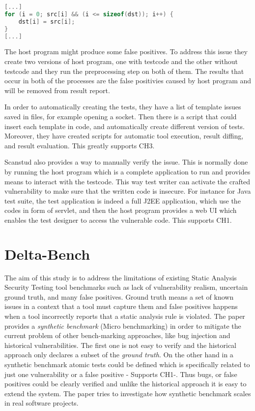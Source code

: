 \documentclass[authoryear,preprint]{sigplanconf}
\begin{document}
\begin{lstlisting}[float,caption=Off-by-one vulnerability caused by insecure loop condition \cite{Scanstud} ,label=ls:sourcec,language=C]
[...]
for (i = 0; src[i] && (i <= sizeof(dst)); i++) {
	dst[i] = src[i];
}
[...]
\end{lstlisting}

The host program might produce some false positives. To address this issue they create two versions of host program, one with testcode and the other without testcode and they run the preprocessing step on both of them. The results that occur in both of the processes are the false positivies caused by host program and will be removed from result report. 

In order to automatically creating the tests, they have a list of template issues saved in files, for example opening a socket. Then there is a script that could insert each template in code, and automatically create different version of tests. Moreover, they have created scripts for automatic tool execution, result diffing, and result evaluation. This greatly supports CH3.

Scanstud also provides a way to manually verify the issue. This is normally done by running the host program which is a complete application to run and provides means to interact with the testcode. This way test writer can activate the crafted vulnerability to make sure that the written code is insecure. For instance for Java test suite, the test application is indeed a full J2EE application, which use the codes in form of servlet, and then the host program provides a web UI which enables the test designer to access the vulnerable code. This supports CH1.

\section{Delta-Bench}
\label{sec:sec_delta}
The aim of this study is to address the limitations of existing Static Analysis Security Testing tool benchmarks such as lack of vulnerability realism, uncertain ground truth, and many false positives\cite{8170097}. Ground truth means a set of known issues in a context that a tool must capture them and false positives happens when a tool incorrectly reports that a static analysis rule is violated. The paper provides a \textit{synthetic benchmark} (Micro benchmarking) in order to mitigate the current problem of other bench-marking approaches, like bug injection and historical vulnerabilities. The first one is not easy to verify \cite{Dahse:2014:SDS:2671225.2671288} and the historical approach only declares a subset of the \textit{ground truth}. On the other hand in a synthetic benchmark atomic tests could be defined which is specifically related to just one vulnerability or a false positive - Supports CH1-. Thus bugs, or false positives could be clearly verified and unlike the historical approach it is easy to extend the system. The paper tries to investigate how synthetic benchmark scales in real software projects. 
\end{document}
